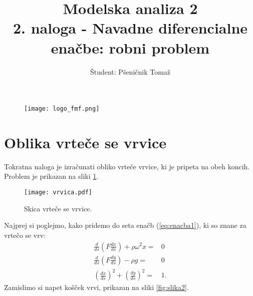 \documentclass[12pt,a4paper]{article}
\title{\textbf{Modelska analiza 2} \\ 2. naloga - Navadne diferencialne enačbe: robni problem \\}
\author{Študent: Pšeničnik Tomaž}
\begin{document}

	\begin{figure} [h]
  \centering
  \texttt{[image: logo\_fmf.png]}
  \maketitle
\end{figure}
	
	
	
	\newpage
	
	
	
\section*{Oblika vrteče se vrvice}

Tokratna naloga je izračunati  obliko vrteče vrvice, ki je pripeta na obeh koncih. Problem je prikazan na sliki \ref{fig:slika1}.

\begin{figure}[H]
    \centering
        \texttt{[image: vrvica.pdf]}
    \caption{Skica vrteče se vrvice.} \label{fig:slika1}
\end{figure}

\noindent Najprej si poglejmo, kako pridemo do seta enačb (\ref{eq:enacba1}), ki so znane za vrtečo se vrv:
\begin{align} \label{eq:enacba1}
\frac{d}{ds} \left(F\frac{dx}{ds} \right) + \rho \omega ^{2} x =& 0 \nonumber  \\
\frac{d}{ds} \left(F\frac{dy}{ds} \right) -\rho g =& 0  \nonumber \\
\left( \frac{dx}{ds} \right) ^{2} + \left( \frac{dy}{ds} \right) ^{2} =& 1.
\end{align}
Zamislimo si napet košček vrvi, prikazan na sliki \ref{fig:slika2}.
\end{document}
